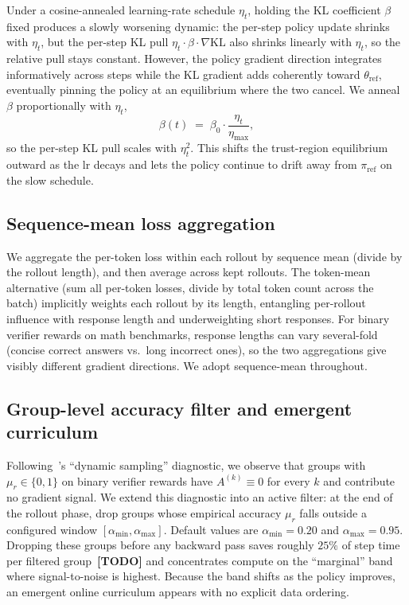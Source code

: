 \documentclass[11pt]{article}
\theoremstyle{definition}
\theoremstyle{remark}
\newcommand{\KL}{\mathrm{KL}}
\newcommand{\answerTODO}[1][]{{\color{red}\textbf{[TODO}#1\textbf{]}}}
\begin{document}
Under a cosine-annealed learning-rate schedule $\eta_t$, holding the
KL coefficient $\beta$ fixed produces a slowly worsening dynamic: the
per-step policy update shrinks with $\eta_t$, but the per-step KL pull
$\eta_t \cdot \beta \cdot \nabla \KL$ also shrinks linearly with
$\eta_t$, so the relative pull stays constant.  However, the policy
gradient direction integrates informatively across steps while the KL
gradient adds coherently toward $\theta_{\mathrm{ref}}$, eventually
pinning the policy at an equilibrium where the two cancel.  We anneal
$\beta$ proportionally with $\eta_t$,
\begin{equation}
\beta(t) \;=\; \beta_0 \cdot \frac{\eta_t}{\eta_{\max}},
\label{eq:method-anneal}
\end{equation}
so the per-step KL pull scales with $\eta_t^2$.  This shifts the
trust-region equilibrium outward as the lr decays and lets the policy
continue to drift away from $\pi_{\mathrm{ref}}$ on the slow
schedule.

\subsection{Sequence-mean loss aggregation}
\label{sec:method-seqmean}

We aggregate the per-token loss within each rollout by sequence mean
(divide by the rollout length), and then average across kept rollouts.
The token-mean alternative (sum all per-token losses, divide by total
token count across the batch) implicitly weights each rollout by its
length, entangling per-rollout influence with response length and
underweighting short responses.  For binary verifier rewards on math
benchmarks, response lengths can vary several-fold (concise correct
answers vs.\ long incorrect ones), so the two aggregations give
visibly different gradient directions.  We adopt sequence-mean
throughout.

\subsection{Group-level accuracy filter and emergent curriculum}
\label{sec:method-filter}

Following~\citet{yu2024dapo}'s ``dynamic sampling'' diagnostic, we
observe that groups with $\mu_r \in \{0, 1\}$ on binary verifier
rewards have $A^{(k)} \equiv 0$ for every $k$ and contribute no
gradient signal.  We extend this diagnostic into an active filter: at
the end of the rollout phase, drop groups whose empirical accuracy
$\mu_r$ falls outside a configured window
$[\alpha_{\min}, \alpha_{\max}]$.  Default values are
$\alpha_{\min} = 0.20$ and $\alpha_{\max} = 0.95$.  Dropping these
groups before any backward pass saves roughly $25\%$ of step time
per filtered group~\answerTODO{} and concentrates compute on the
``marginal'' band where signal-to-noise is highest.  Because the
band shifts as the policy improves, an emergent online curriculum
appears with no explicit data ordering.
\end{document}
